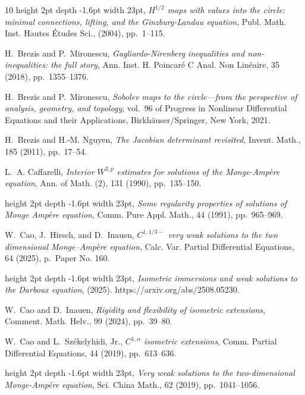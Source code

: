 \documentclass[12pt]{article}
\theoremstyle{plain}
\numberwithin{equation}{section}
\begin{document}
\begin{thebibliography}{10}
\leavevmode\vrule height 2pt depth -1.6pt width 23pt, {\em {$H^{1/2}$} maps
  with values into the circle: minimal connections, lifting, and the
  {G}inzburg-{L}andau equation}, Publ. Math. Inst. Hautes \'Etudes Sci.,
  (2004), pp.~1--115.

{\sc H.~Brezis and P.~Mironescu}, {\em Gagliardo-{N}irenberg inequalities and
  non-inequalities: the full story}, Ann. Inst. H. Poincar\'e{} C Anal. Non
  Lin\'eaire, 35 (2018), pp.~1355--1376.

{\sc H.~Brezis and P.~Mironescu}, {\em Sobolev maps to the circle---from the
  perspective of analysis, geometry, and topology}, vol.~96 of Progress in
  Nonlinear Differential Equations and their Applications,
  Birkh\"{a}user/Springer, New York, 2021.

{\sc H.~Brezis and H.-M. Nguyen}, {\em The {J}acobian determinant revisited},
  Invent. Math., 185 (2011), pp.~17--54.

{\sc L.~A. Caffarelli}, {\em Interior {$W^{2,p}$} estimates for solutions of
  the {M}onge-{A}mp\`ere equation}, Ann. of Math. (2), 131 (1990),
  pp.~135--150.

\leavevmode\vrule height 2pt depth -1.6pt width 23pt, {\em Some regularity
  properties of solutions of {M}onge {A}mp\`ere equation}, Comm. Pure Appl.
  Math., 44 (1991), pp.~965--969.

{\sc W.~Cao, J.~Hirsch, and D.~Inauen}, {\em {$C^{1,{1}/{3}-}$} very weak
  solutions to the two dimensional {M}onge--{A}mp\`ere equation}, Calc. Var.
  Partial Differential Equations, 64 (2025), p.~Paper No. 160.

\leavevmode\vrule height 2pt depth -1.6pt width 23pt, {\em Isometric immersions
  and weak solutions to the {D}arboux equation},  (2025).
\newblock https://arxiv.org/abs/2508.05230.

{\sc W.~Cao and D.~Inauen}, {\em Rigidity and flexibility of isometric
  extensions}, Comment. Math. Helv., 99 (2024), pp.~39--80.

{\sc W.~Cao and L.~Sz\'ekelyhidi, Jr.}, {\em {$C^{1,\alpha}$} isometric
  extensions}, Comm. Partial Differential Equations, 44 (2019), pp.~613--636.

\leavevmode\vrule height 2pt depth -1.6pt width 23pt, {\em Very weak solutions
  to the two-dimensional {M}onge-{A}mp\'ere equation}, Sci. China Math., 62
  (2019), pp.~1041--1056.


\end{thebibliography}
\end{document}
